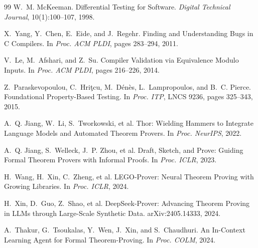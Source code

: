 \documentclass[11pt,a4paper]{article}
\begin{document}
\begin{thebibliography}{99}
W.~M. McKeeman.
Differential Testing for Software.
\emph{Digital Technical Journal}, 10(1):100--107, 1998.

X.~Yang, Y.~Chen, E.~Eide, and J.~Regehr.
Finding and Understanding Bugs in C Compilers.
In \emph{Proc. ACM PLDI}, pages 283--294, 2011.

V.~Le, M.~Afshari, and Z.~Su.
Compiler Validation via Equivalence Modulo Inputs.
In \emph{Proc. ACM PLDI}, pages 216--226, 2014.

Z.~Paraskevopoulou, C.~Hri\c{t}cu, M.~D\'en\`es, L.~Lampropoulos, and
B.~C. Pierce.
Foundational Property-Based Testing.
In \emph{Proc. ITP}, LNCS 9236, pages 325--343, 2015.

A.~Q. Jiang, W.~Li, S.~Tworkowski, et al.
Thor: Wielding Hammers to Integrate Language Models and Automated
Theorem Provers.
In \emph{Proc. NeurIPS}, 2022.

A.~Q. Jiang, S.~Welleck, J.~P. Zhou, et al.
Draft, Sketch, and Prove: Guiding Formal Theorem Provers with Informal
Proofs.
In \emph{Proc. ICLR}, 2023.

H.~Wang, H.~Xin, C.~Zheng, et al.
LEGO-Prover: Neural Theorem Proving with Growing Libraries.
In \emph{Proc. ICLR}, 2024.

H.~Xin, D.~Guo, Z.~Shao, et al.
DeepSeek-Prover: Advancing Theorem Proving in LLMs through Large-Scale
Synthetic Data.
arXiv:2405.14333, 2024.

A.~Thakur, G.~Tsoukalas, Y.~Wen, J.~Xin, and S.~Chaudhuri.
An In-Context Learning Agent for Formal Theorem-Proving.
In \emph{Proc. COLM}, 2024.

\end{thebibliography}
\end{document}
